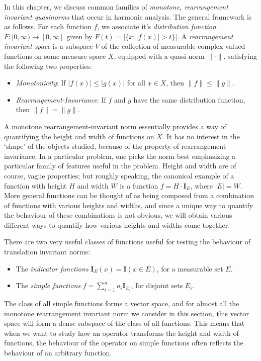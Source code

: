 In this chapter, we discuss common families of \emph{monotone, rearrangement invariant quasinorms} that occur in harmonic analysis. The general framework is as follows. For each function $f$, we associate it's \emph{distribution function} $F: [0,\infty) \to [0,\infty]$ given by $F(t) = |\{ x : |f(x)| > t \}|$. A \emph{rearrangement invariant space} is a subspace $V$ of the collection of measurable complex-valued functions on some measure space $X$, equipped with a quasi-norm $\| \cdot \|$, satisfying the following two properties:
%
\begin{itemize}
    \item \emph{Monotonicity}: If $|f(x)| \leq |g(x)|$ for all $x \in X$, then $\| f \| \leq \| g \|$.

    \item \emph{Rearrangement-Invariance}: If $f$ and $g$ have the same distribution function, then $\| f \| = \| g \|$.
\end{itemize}
%
A monotone rearrangement-invariant norm essentially provides a way of quantifying the height and width of functions on $X$. It has no interest in the `shape' of the objects studied, because of the property of rearrangement invariance. In a particular problem, one picks the norm best emphasizing a particular family of features useful in the problem. Height and width are of course, vague properties; but roughly speaking, the canonical example of a function with height $H$ and width $W$ is a function $f = H \cdot \mathbf{I}_E$, where $|E| = W$. More general functions can be thought of as being composed from a combination of  functions with various heights and widths, and since a unique way to quantify the behaviour of these combinations is not obvious, we will obtain various different ways to quantify how various heights and widths come together.

There are two very useful classes of functions useful for testing the behaviour of translation invariant norms:
%
\begin{itemize}
    \item The \emph{indicator functions} $\mathbf{I}_E(x) = \mathbf{I}(x \in E)$, for a measurable set $E$.
    \item The \emph{simple functions} $f = \sum_{i = 1}^n a_i \mathbf{I}_{E_i}$, for disjoint sets $E_i$.
\end{itemize}
%
The class of all simple functions forms a vector space, and for almost all the monotone rearrangement invariant norm we consider in this section, this vector space will form a dense subspace of the class of all functions. This means that when we want to study how an operator transforms the height and width of functions, the behaviour of the operator on simple functions often reflects the behaviour of an arbitrary function.


